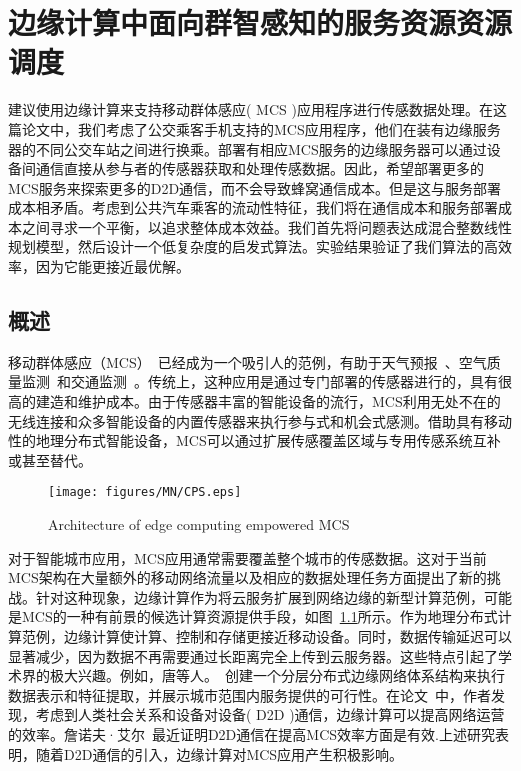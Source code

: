 \chapter{边缘计算中面向群智感知的服务资源资源调度}

建议使用边缘计算来支持移动群体感应( MCS )应用程序进行传感数据处理。在这篇论文中，我们考虑了公交乘客手机支持的MCS应用程序，他们在装有边缘服务器的不同公交车站之间进行换乘。部署有相应MCS服务的边缘服务器可以通过设备间通信直接从参与者的传感器获取和处理传感数据。因此，希望部署更多的MCS服务来探索更多的D2D通信，而不会导致蜂窝通信成本。但是这与服务部署成本相矛盾。考虑到公共汽车乘客的流动性特征，我们将在通信成本和服务部署成本之间寻求一个平衡，以追求整体成本效益。我们首先将问题表达成混合整数线性规划模型，然后设计一个低复杂度的启发式算法。实验结果验证了我们算法的高效率，因为它能更接近最优解。


\section{概述}

移动群体感应（MCS）~\cite{ganti2011mobile,DBLP:journals/csur/GuoWYWYHZ15}已经成为一个吸引人的范例，有助于天气预报~\cite{DBLP:conf/icc/YuZZWKL10}、空气质量监测~\cite{DBLP:conf/huc/ZhangXWC14}和交通监测~\cite{DBLP:conf/icdcs/ZhouJL15}。传统上，这种应用是通过专门部署的传感器进行的，具有很高的建造和维护成本。由于传感器丰富的智能设备的流行，MCS利用无处不在的无线连接和众多智能设备的内置传感器来执行参与式和机会式感测。借助具有移动性的地理分布式智能设备，MCS可以通过扩展传感覆盖区域与专用传感系统互补或甚至替代。

\begin{figure}[!h]
\centering
\texttt{[image: figures/MN/CPS.eps]}
\vspace{-0.5em}
\caption{Architecture of edge computing empowered MCS}
\label{Figure_edge}
\end{figure}

对于智能城市应用，MCS应用通常需要覆盖整个城市的传感数据。这对于当前MCS架构在大量额外的移动网络流量以及相应的数据处理任务方面提出了新的挑战。针对这种现象，边缘计算作为将云服务扩展到网络边缘的新型计算范例，可能是MCS的一种有前景的候选计算资源提供手段，如图~\ref{Figure_edge}所示。作为地理分布式计算范例，边缘计算使计算、控制和存储更接近移动设备。同时，数据传输延迟可以显著减少，因为数据不再需要通过长距离完全上传到云服务器。这些特点引起了学术界的极大兴趣。例如，唐等人。~\cite{DBLP:journals/tii/TangCHPWHY17}创建一个分层分布式边缘网络体系结构来执行数据表示和特征提取，并展示城市范围内服务提供的可行性。在论文~\cite{DBLP:conf/wasa/Yan0WWW17}中，作者发现，考虑到人类社会关系和设备对设备( D2D )通信，边缘计算可以提高网络运营的效率。詹诺夫·艾尔~\cite{DBLP:journals/iotj/ZhanXZW18}最近证明D2D通信在提高MCS效率方面是有效.上述研究表明，随着D2D通信的引入，边缘计算对MCS应用产生积极影响。


